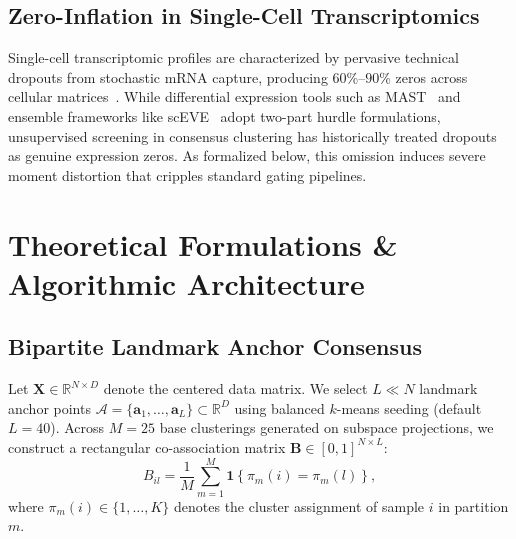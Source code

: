\documentclass[preprint,12pt]{elsarticle}
\begin{document}
\subsection{Zero-Inflation in Single-Cell Transcriptomics}
Single-cell transcriptomic profiles are characterized by pervasive technical dropouts from stochastic mRNA capture, producing $60\%\text{--}90\%$ zeros across cellular matrices~\cite{zheng2017massively,klein2015droplet,baron2016single}. While differential expression tools such as MAST~\cite{finak2015mast} and ensemble frameworks like scEVE~\cite{sceve2025single} adopt two-part hurdle formulations, unsupervised screening in consensus clustering has historically treated dropouts as genuine expression zeros. As formalized below, this omission induces severe moment distortion that cripples standard gating pipelines.

\section{Theoretical Formulations \& Algorithmic Architecture}\label{sec:methods}

\subsection{Bipartite Landmark Anchor Consensus}
Let $\mathbf{X} \in \mathbb{R}^{N \times D}$ denote the centered data matrix. We select $L \ll N$ landmark anchor points $\mathcal{A} = \{\mathbf{a}_1, \dots, \mathbf{a}_L\} \subset \mathbb{R}^D$ using balanced $k$-means seeding (default $L = 40$). Across $M = 25$ base clusterings generated on subspace projections, we construct a rectangular co-association matrix $\mathbf{B} \in [0, 1]^{N \times L}$:
\begin{equation}
    B_{il} = \frac{1}{M}\sum_{m=1}^M \mathbf{1}\left\{\pi_m(i) = \pi_m(l)\right\},
\end{equation}
where $\pi_m(i) \in \{1, \dots, K\}$ denotes the cluster assignment of sample $i$ in partition $m$. 
\end{document}
